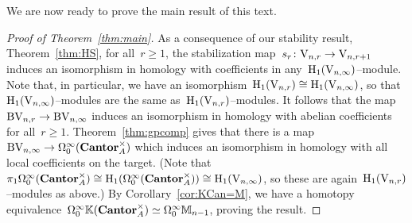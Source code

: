 


We are now ready to prove the main result of this text.



\begin{proof}[Proof of Theorem~\ref{thm:main}]
As a consequence of our stability result, Theorem~\ref{thm:HS}, for all~$r\geqslant 1$, the stabilization map~\hbox{$s_r\colon\mathrm{V}_{n,r}\to \mathrm{V}_{n,r+1}$} induces an isomorphism in homology with coefficients in any~$\mathrm{H}_1(\mathrm{V}_{n,\infty})$--module. Note that, in particular, we have an isomorphism~$\mathrm{H}_1(\mathrm{V}_{n,r})\cong\mathrm{H}_1(\mathrm{V}_{n,\infty})$, so that~$\mathrm{H}_1(\mathrm{V}_{n,\infty})$--modules are the same as~$\mathrm{H}_1(\mathrm{V}_{n,r})$--modules.  It follows that 
the map~$\mathrm{B}\mathrm{V}_{n,r}\to \mathrm{B}\mathrm{V}_{n,\infty}$ induces an isomorphism in homology with abelian coefficients for all~$r\geqslant 1$. 
Theorem~\ref{thm:gpcomp} gives that there is a map~\hbox{$\mathrm{B}\mathrm{V}_{n,\infty}\to \Omega^\infty_0(\mathbf{Cantor}_A^\times)$} which induces an isomorphism in homology with all local coefficients on the target. (Note that~\hbox{$\pi_1 \Omega^\infty_0(\mathbf{Cantor}_A^\times)\cong\mathrm{H}_1( \Omega^\infty_0(\mathbf{Cantor}_A^\times))\cong\mathrm{H}_1(\mathrm{V}_{n,\infty})$}, so these are again~$\mathrm{H}_1(\mathrm{V}_{n,r})$--modules as above.)
By Corollary~\ref{cor:KCan=M}, we have a homotopy equivalence~$\Omega^\infty_0\mathbb{K}(\mathbf{Cantor}_A^\times)\simeq \Omega_0^\infty\mathbb{M}_{n-1}$, proving the result.
\end{proof}

